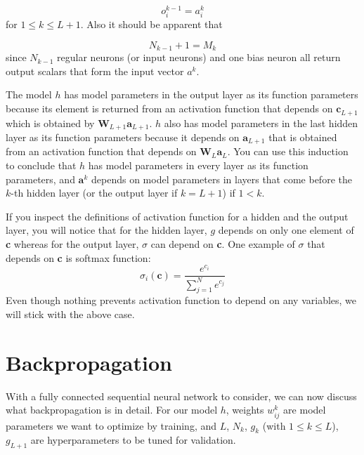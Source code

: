 \documentclass[letterpaper, 11pt]{article}
\newcommand{\w}{w^{k}_{ij}}
\numberwithin{equation}{section}
\numberwithin{figure}{section}
\numberwithin{table}{section}
\begin{document}
\begin{equation}
	o^{k-1}_{i} = a^{k}_{i}
\end{equation}
for \(1 \le k \le L+1\). Also it should be apparent that

\begin{equation}
	N_{k-1} + 1 = M_{k}\label{eq1.7}
\end{equation}
since \(N_{k-1}\) regular neurons (or input neurons) and one bias neuron all return output scalars that form the input vector \(a^{k}\).

The model \(h\) has model parameters in the output layer as its function parameters because its element is returned from an activation function that depends on \(\textbf{c}_{L+1}\) which is obtained by \(\textbf{W}_{L+1}\textbf{a}_{L+1}\). \(h\) also has model parameters in the last hidden layer as its function parameters because it depends on \(\textbf{a}_{L+1}\) that is obtained from an activation function that depends on \(\textbf{W}_{L}\textbf{a}_{L}\). You can use this induction to conclude that \(h\) has model parameters in every layer as its function parameters, and \(\textbf{a}^{k}\) depends on model parameters in layers that come before the \(k\)-th hidden layer (or the output layer if \(k = L+1\)) if \(1 < k\). 

If you inspect the definitions of activation function for a hidden and the output layer, you will notice that for the hidden layer, \(g\) depends on only one element of \textbf{c} whereas for the output layer, \(\sigma\) can depend on \textbf{c}. One example of \(\sigma\) that depends on \textbf{c} is softmax function:
\begin{equation}
	\sigma_{i}(\textbf{c}) = \frac{e^{c_{i}}}{\sum\limits^{N}_{j=1} e^{c_{j}}}  
\end{equation}
Even though nothing prevents activation function to depend on any variables, we will stick with the above case.

\clearpage
\section{Backpropagation}
With a fully connected sequential neural network to consider, we can now discuss what backpropagation is in detail. For our model \(h\), weights \(\w\) are model parameters we want to optimize by training, and \(L\), \(N_{k}\), \(g_{k}\) (with \(1 \le k \le L\)), \(g_{L+1}\) are hyperparameters to be tuned for validation. 

\end{document}
